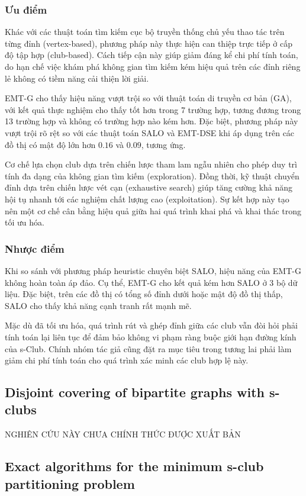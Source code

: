 \subsubsection{Ưu điểm}
    Khác với các thuật toán tìm kiếm cục bộ truyền thống chủ yếu thao tác trên từng đỉnh (vertex-based), phương pháp này thực hiện can thiệp trực tiếp ở cấp độ tập hợp (club-based). 
    Cách tiếp cận này giúp giảm đáng kể chi phí tính toán, do hạn chế việc khám phá không gian tìm kiếm kém hiệu quả trên các đỉnh riêng lẻ không có tiềm năng cải thiện lời giải.

    EMT-G cho thấy hiệu năng vượt trội so với thuật toán di truyền cơ bản (GA), với kết quả thực nghiệm cho thấy tốt hơn trong 7 trường hợp, tương đương trong 13 trường hợp và không có trường hợp nào kém hơn. 
    Đặc biệt, phương pháp này vượt trội rõ rệt so với các thuật toán SALO và EMT-DSE khi áp dụng trên các đồ thị có mật độ lớn hơn $0.16$ và $0.09$, tương ứng.

    Cơ chế lựa chọn club dựa trên chiến lược tham lam ngẫu nhiên cho phép duy trì tính đa dạng của không gian tìm kiếm (exploration). 
    Đồng thời, kỹ thuật chuyển đỉnh dựa trên chiến lược vét cạn (exhaustive search) giúp tăng cường khả năng hội tụ nhanh tới các nghiệm chất lượng cao (exploitation). 
    Sự kết hợp này tạo nên một cơ chế cân bằng hiệu quả giữa hai quá trình khai phá và khai thác trong tối ưu hóa.

\subsubsection{Nhược điểm}
Khi so sánh với phương pháp heuristic chuyên biệt SALO, hiệu năng của EMT-G không hoàn toàn áp đảo. Cụ thể, EMT-G cho kết quả kém hơn SALO ở 3 bộ dữ liệu. Đặc biệt, trên các đồ thị có tổng số đỉnh dưới hoặc mật độ đồ thị thấp, SALO cho thấy khả năng cạnh tranh rất mạnh mẽ.

Mặc dù đã tối ưu hóa, quá trình rút và ghép đỉnh giữa các club vẫn đòi hỏi phải tính toán lại liên tục để đảm bảo không vi phạm ràng buộc giới hạn đường kính của s-Club. Chính nhóm tác giả cũng đặt ra mục tiêu trong tương lai phải làm giảm chi phí tính toán cho quá trình xác minh các club hợp lệ này.


\subsection{Disjoint covering of bipartite graphs with s-clubs~\cite{monti2025disjoint}}
NGHIÊN CỨU NÀY CHƯA CHÍNH THỨC ĐƯỢC XUẤT BẢN


\subsection{Exact algorithms for the minimum s-club partitioning problem~\cite{yezerska2019exact}}




